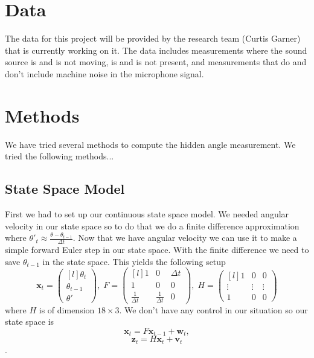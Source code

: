 \documentclass[11pt]{amsart}
\begin{document}
\section{Data}
The data for this project will be provided by the research team (Curtis Garner) that is currently working on it. The data includes measurements where the sound 
source is and is not moving, is and is not present, and measurements that do and don’t include machine noise in the microphone signal.




\section{Methods}
We have tried several methods to compute the hidden angle measurement. We tried the following methods...

\subsection{State Space Model}
First we had to set up our continuous state space model. We needed angular velocity in our state space so to do that we do a finite difference approximation 
where $\theta'_t \approx \frac{\theta - \theta_{t-1}}{\Delta t}$. Now that we have angular velocity we can use it to make a simple forward Euler step in our state 
space. With the finite difference we need to save $\theta_{t-1}$ in the state space. This yields the following setup
\[\mathbf{x}_t = \begin{pmatrix*}[l]
    \theta_t \\
    \theta_{t-1} \\
    \theta'
\end{pmatrix*},\;  
F = \begin{pmatrix*}[l]
    1 & 0 & \Delta t \\
    1 & 0 & 0 \\
    \frac{1}{\Delta t} & \frac{1}{\Delta t} & 0
\end{pmatrix*},\;
H = \begin{pmatrix*}[l]
    1 & 0 & 0 \\
    \vdots & \vdots & \vdots\\
    1 & 0 & 0

\end{pmatrix*}\]
 where $H$ is of dimension $18\times3$. We don't have any control in our situation so our state space is
 \[\mathbf{x}_t = F\mathbf{x}_{t-1} + \mathbf{w}_t,\]
\[\mathbf{z}_t = H\mathbf{x}_t + \mathbf{v}_t\].
\end{document}
